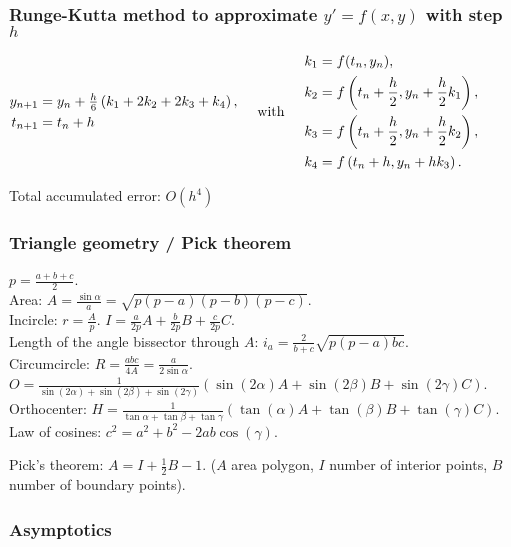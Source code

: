 \documentclass[landscape,a4paper,twocolumn,10pt]{report}
\begin{document}
\subsubsection*{Runge-Kutta method to approximate $y'=f(x,y)$ with step $h$}
$\begin{aligned}
y_{n+1} &= y_n + \tfrac{h}{6}\left(k_1 + 2k_2 + 2k_3 + k_4 \right),\\
t_{n+1} &= t_n + h \\
\end{aligned}
\hspace{0.5cm} \mbox{with} \hspace{0.5cm}
\begin{aligned}
 k_1 &= f(t_n, y_n), \\
 k_2 &= f\left(t_n + \frac{h}{2}, y_n + \frac{h}{2}k_1\right), \\
 k_3 &= f\left(t_n + \frac{h}{2}, y_n + \frac{h}{2}k_2\right), \\
 k_4 &= f\left(t_n + h, y_n + h k_3\right).
\end{aligned}
$

\noindent Total accumulated error: $O(h^4)$

\subsubsection*{Triangle geometry / Pick theorem}

$p=\frac{a+b+c}{2}$.\\
Area: $A=\frac{\sin\alpha}{a}=\sqrt{p(p-a)(p-b)(p-c)}$.\\
Incircle: $r=\frac{A}{p}$. $I=\frac{a}{2p}A+\frac{b}{2p}B+\frac{c}{2p}C$.\\
Length of the angle bissector through $A$: $i_a=\frac{2}{b+c}\sqrt{p(p-a)bc}$.\\
Circumcircle: $R=\frac{abc}{4A}=\frac{a}{2\sin\alpha}$. $O=\frac{1}{\sin(2\alpha)+\sin(2\beta)+\sin(2\gamma)}(\sin(2\alpha)A+\sin(2\beta)B+\sin(2\gamma)C)$.\\
Orthocenter: $H=\frac{1}{\tan\alpha+\tan\beta+\tan\gamma}(\tan(\alpha)A+\tan(\beta)B+\tan(\gamma)C)$.\\
Law of cosines: $c^2=a^2+b^2-2ab\cos(\gamma)$.

\noindent Pick's theorem: $A=I+\frac{1}{2}B-1$. ($A$ area polygon, $I$ number of interior points, $B$ number of boundary points).


\subsubsection*{Asymptotics}
\end{document}
